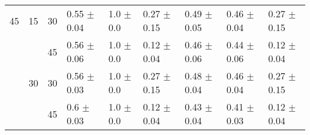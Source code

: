\begin{tabular}{lllllllll}
45 & 15 & 30 &                 0.55 $\pm$ 0.04 &              1.0 $\pm$ 0.0 &            0.27 $\pm$ 0.15 &                    0.49 $\pm$ 0.05 &                    0.46 $\pm$ 0.04 &               0.27 $\pm$ 0.15 \\
   &    & 45 &                 0.56 $\pm$ 0.06 &              1.0 $\pm$ 0.0 &            \cellcolor{blue!25} 0.12 $\pm$ 0.04 &                    0.46 $\pm$ 0.06 &                    0.44 $\pm$ 0.06 &               0.12 $\pm$ 0.04 \\
   & 30 & 30 &                 0.56 $\pm$ 0.03 &              1.0 $\pm$ 0.0 &            0.27 $\pm$ 0.15 &                    0.48 $\pm$ 0.04 &                    0.46 $\pm$ 0.04 &               0.27 $\pm$ 0.15 \\
   &    & 45 &                  0.6 $\pm$ 0.03 &              1.0 $\pm$ 0.0 &            0.12 $\pm$ 0.04 &                    0.43 $\pm$ 0.04 &                    0.41 $\pm$ 0.03 &               0.12 $\pm$ 0.04 \\
\bottomrule
\end{tabular}
